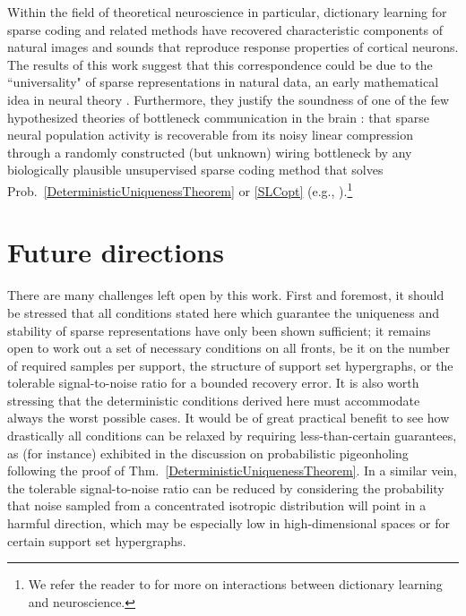 Within the field of theoretical neuroscience in particular, dictionary learning for sparse coding and related methods have recovered characteristic components of natural images \cite{Olshausen96, hyvarinen1999fast, bell1997independent, van1998independent} and sounds \cite{bellsejnowski1996, smithlewicki2006, Carlson12} that reproduce response properties of cortical neurons. The results of this work suggest that this correspondence could be due to the ``universality" of sparse representations in natural data, an early mathematical idea in neural theory \cite{pitts1947}. Furthermore, they justify the soundness of one of the few hypothesized theories of bottleneck communication in the brain \cite{Isely10}: that sparse neural population activity is recoverable from its noisy linear compression through a randomly constructed (but unknown) wiring bottleneck by any biologically plausible unsupervised sparse coding method that solves Prob.~\ref{DeterministicUniquenessTheorem} or \ref{SLCopt} (e.g., \cite{rehnsommer2007, rozell2007neurally, pehlevan2015normative}).\footnote{We refer the reader to \cite{ganguli2012compressed} for more on interactions between dictionary learning and neuroscience.}


\section{Future directions}\label{FutureDirections}

There are many challenges left open by this work. First and foremost, it should be stressed that all conditions stated here which guarantee the uniqueness and stability of sparse representations have only been shown sufficient; it remains open to work out a set of necessary conditions on all fronts, be it on the number of required samples per support, the structure of support set hypergraphs, or the tolerable signal-to-noise ratio for a bounded recovery error. It is also worth stressing that the deterministic conditions derived here must accommodate always the worst possible cases. It would be of great practical benefit to see how drastically all conditions can be relaxed by requiring less-than-certain guarantees, as (for instance) exhibited in the discussion on probabilistic pigeonholing following the proof of Thm.~\ref{DeterministicUniquenessTheorem}. In a similar vein, the tolerable signal-to-noise ratio can be reduced by considering the probability that noise sampled from a concentrated isotropic distribution will point in a harmful direction, which may be especially low in high-dimensional spaces or for certain support set hypergraphs.

